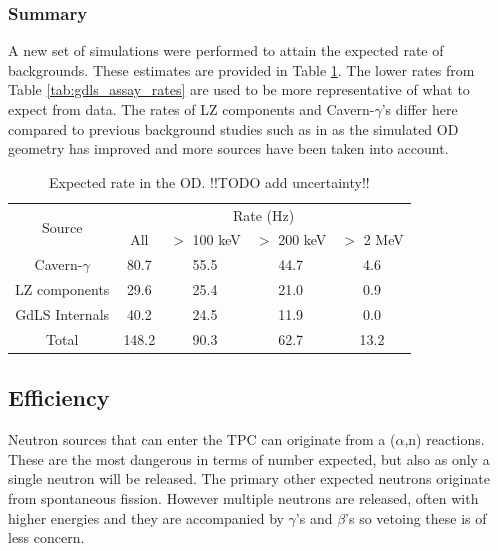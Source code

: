 \subsubsection{Summary}
\par
A new set of simulations were performed to attain the expected rate of backgrounds.
These estimates are provided in Table \ref{tab:od_expected_rates}.
The lower rates from Table \ref{tab:gdls_assay_rates} are used to be more representative of what to expect from data.
The rates of LZ components and Cavern-$\gamma$'s differ here compared to previous background studies such as in \cite{LZ_TechnicalDesignReview_ref,LZ_projected_sensitivity_paper_ref,scotthaselschwardt_thesis_ref} as the simulated OD geometry has improved and more sources have been taken into account.

\begin{table}[!htbp]
    \centering
    \begin{tabular}{c|c|c|c|c} %
    \hline
    \multirow{2}{*}{Source} & \multicolumn{4}{c}{Rate (Hz)} \\
                            & All   & $>$ 100 keV & $>$ 200 keV & $>$ 2 MeV \\ \hline
    Cavern-$\gamma$         & 80.7  & 55.5        & 44.7        & 4.6       \\
    LZ components           & 29.6  & 25.4        & 21.0        & 0.9       \\
    GdLS Internals          & 40.2  & 24.5        & 11.9        & 0.0       \\
    Total                   & 148.2 & 90.3        & 62.7        & 13.2
    \end{tabular}
    \caption{Expected rate in the OD. !!TODO add uncertainty!!}
    \label{tab:od_expected_rates}
\end{table} 

\subsection{Efficiency}
\par
Neutron sources that can enter the TPC can originate from a ($\alpha$,n) reactions.
These are the most dangerous in terms of number expected, but also as only a single neutron will be released.
The primary other expected neutrons originate from spontaneous fission.
However multiple neutrons are released, often with higher energies and they are accompanied by $\gamma$'s and $\beta$'s so vetoing these is of less concern.

